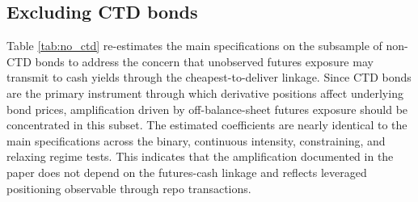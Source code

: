 \documentclass[english, 11pt, oneside]{article}
\begin{document}
\clearpage
\subsection{Excluding CTD bonds}
\label{subsec:ctd}

Table \ref{tab:no_ctd} re-estimates the main specifications on the subsample of non-CTD bonds to address the concern that unobserved futures exposure may transmit to cash yields through the cheapest-to-deliver linkage. Since CTD bonds are the primary instrument through which derivative positions affect underlying bond prices, amplification driven by off-balance-sheet futures exposure should be concentrated in this subset. The estimated coefficients are nearly identical to the main specifications across the binary, continuous intensity, constraining, and relaxing regime tests. This indicates that the amplification documented in the paper does not depend on the futures-cash linkage and reflects leveraged positioning observable through repo transactions. \\
\end{document}
